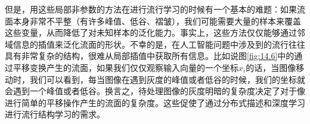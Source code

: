 但是，用这些局部非参数的方法在进行流行学习的时候有一个基本的难题：如果流面本身非常不平整（有许多峰值、低谷、褶皱），我们可能需要大量的样本来覆盖这些变量，从而降低了对未知样本的泛化能力。事实上，这些方法仅仅能够通过邻域信息的插值来泛化流面的形状。不幸的是，在人工智能问题中涉及到的流行往往具有非常复杂的结构，很难从局部插值中获取所有信息。比如说图\ref{fig:14.6}中的通过平移变换产生的流面，如果我们仅仅观察输入向量的一个坐标$x_i$的话，当图像移动时，我们可以看到，每当图像在遇到灰度的峰值或者低谷的时候，我们的坐标就会遇到一个峰值或者低谷。换言之，待处理图像的灰度明暗的复杂度决定了对于像进行简单的平移操作产生的流面的复杂度。这些促使了通过分布式描述和深度学习进行流行结构学习的需求。
